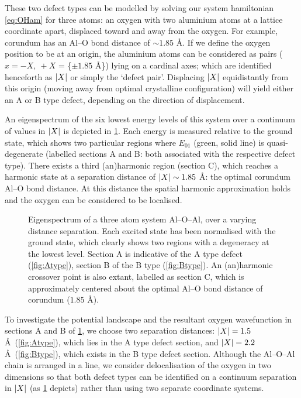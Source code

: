 These two defect types can be modelled by solving our system hamiltonian \cref{eq:OHam} for three atoms: an oxygen with two aluminium atoms at a lattice coordinate apart, displaced toward and away from the oxygen.
For example, corundum has an Al--O bond distance of $\sim\!1.85$ \AA.
If we define the oxygen position to be at an origin, the aluminium atoms can be considered as pairs ($x = -X, \: +X$ = \{$\pm 1.85$ \AA\}) lying on a cardinal axes; which are identified henceforth as $\lvert X\rvert$ or simply the `defect pair'.
Displacing $\lvert X\rvert$ equidistantly from this origin (\ie moving away from optimal crystalline configuration) will yield either an A or B type defect, depending on the direction of displacement.

An eigenspectrum of the six lowest energy levels of this system over a continuum of values in $\lvert X\rvert$  is depicted in \cref{fig:spectrum}.
Each energy is measured relative to the ground state, which shows two particular regions where $E_{01}$ (green, solid line) is quasi-degenerate (labelled sections A and B: both associated with the respective defect type).
There exists a third (an)harmonic region (section C), which reaches a harmonic state at a separation distance of $\lvert X\rvert \sim 1.85$ \AA: the optimal corundum Al--O bond distance.
At this distance the spatial harmonic approximation holds and the oxygen can be considered to be localised.

\begin{figure}[htp]
  \resizebox{0.9\textwidth}{!}{}
  \caption[Three Atom Eigenspectrum]{\label{fig:spectrum}Eigenspectrum of a three atom system Al--O--Al, over a varying distance separation. Each excited state has been normalised with the ground state, which clearly shows two regions with a degeneracy at the lowest level. Section A is indicative of the A type defect (\cref{fig:Atype}), section B of the B type (\cref{fig:Btype}). An (an)harmonic crossover point is also extant, labelled as section C, which is approximately centered about the optimal Al--O bond distance of corundum ($1.85$ \AA).}
\end{figure}

To investigate the potential landscape and the resultant oxygen wavefunction in sections A and B of \cref{fig:spectrum}, we choose two separation distances: $\lvert X\rvert = 1.5$ \AA\ (\cref{fig:Atype}), which lies in the A type defect section, and $\lvert X\rvert = 2.2$ \AA\ (\cref{fig:Btype}), which exists in the B type defect section.
Although the Al--O--Al chain is arranged in a line, we consider delocalisation of the oxygen in two dimensions so that both defect types can be identified on a continuum separation in $\lvert X\rvert$ (as \cref{fig:spectrum} depicts) rather than using two separate coordinate systems.


